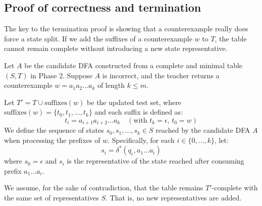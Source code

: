 \subsection{Proof of correctness and termination}

The key to the termination proof is showing that a counterexample really does force a state split. If we add the suffixes of a counterexample $w$ to $T$, the table cannot remain complete without introducing a new state representative.

\begin{formaldetails}
Let $A$ be the candidate DFA constructed from a complete and minimal table $(S, T)$ in Phase 2. Suppose $A$ is incorrect, and the teacher returns a counterexample $w = a_1 a_2 \dots a_k$ of length $k \le m$.

Let $T' = T \cup \text{suffixes}(w)$ be the updated test set, where $\text{suffixes}(w) = \{t_0, t_1, \dots, t_k\}$ and each suffix is defined as:
\[
  t_i = a_{i+1} a_{i+2} \dots a_k \quad (\text{with } t_k = \epsilon, \, t_0 = w)
\]
We define the sequence of states $s_0, s_1, \dots, s_k \in S$ reached by the candidate DFA $A$ when processing the prefixes of $w$. Specifically, for each $i \in \{0, \dots, k\}$, let:
\[
  s_i = \delta^*(q_\epsilon, a_1 \dots a_i)
\]
where $s_0 = \epsilon$ and $s_i$ is the representative of the state reached after consuming prefix $a_1 \dots a_i$.

We assume, for the sake of contradiction, that the table remains $T'$-complete with the same set of representatives $S$. That is, no new representatives are added.


\end{formaldetails}
